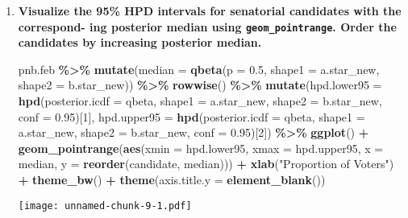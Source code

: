 \documentclass[]{article}
\newenvironment{Shaded}{\begin{snugshade}}{\end{snugshade}}
\newcommand{\AttributeTok}[1]{\textcolor[rgb]{0.13,0.29,0.53}{#1}}
\newcommand{\DecValTok}[1]{\textcolor[rgb]{0.00,0.00,0.81}{#1}}
\newcommand{\FloatTok}[1]{\textcolor[rgb]{0.00,0.00,0.81}{#1}}
\newcommand{\FunctionTok}[1]{\textcolor[rgb]{0.13,0.29,0.53}{\textbf{#1}}}
\newcommand{\NormalTok}[1]{#1}
\newcommand{\SpecialCharTok}[1]{\textcolor[rgb]{0.81,0.36,0.00}{\textbf{#1}}}
\newcommand{\StringTok}[1]{\textcolor[rgb]{0.31,0.60,0.02}{#1}}
\begin{document}
\begin{enumerate}
    
\item \textbf{Visualize the 95\% HPD intervals for senatorial candidates with the correspond-
ing posterior median using \texttt{geom\_pointrange}. Order the candidates by increasing posterior median.}

\begin{Shaded}
\begin{Highlighting}[]
\NormalTok{pnb.feb }\SpecialCharTok{\%\textgreater{}\%}
  \FunctionTok{mutate}\NormalTok{(}\AttributeTok{median =} \FunctionTok{qbeta}\NormalTok{(}\AttributeTok{p =} \FloatTok{0.5}\NormalTok{, }\AttributeTok{shape1 =}\NormalTok{ a.star\_new, }\AttributeTok{shape2 =}\NormalTok{ b.star\_new)) }\SpecialCharTok{\%\textgreater{}\%}
  \FunctionTok{rowwise}\NormalTok{() }\SpecialCharTok{\%\textgreater{}\%}
  \FunctionTok{mutate}\NormalTok{(}\AttributeTok{hpd.lower95 =} \FunctionTok{hpd}\NormalTok{(}\AttributeTok{posterior.icdf =}\NormalTok{ qbeta,}
                           \AttributeTok{shape1 =}\NormalTok{ a.star\_new,}
                           \AttributeTok{shape2 =}\NormalTok{ b.star\_new,}
                           \AttributeTok{conf =} \FloatTok{0.95}\NormalTok{)[}\DecValTok{1}\NormalTok{],}
         \AttributeTok{hpd.upper95 =} \FunctionTok{hpd}\NormalTok{(}\AttributeTok{posterior.icdf =}\NormalTok{ qbeta,}
                           \AttributeTok{shape1 =}\NormalTok{ a.star\_new,}
                           \AttributeTok{shape2 =}\NormalTok{ b.star\_new,}
                           \AttributeTok{conf =} \FloatTok{0.95}\NormalTok{)[}\DecValTok{2}\NormalTok{]) }\SpecialCharTok{\%\textgreater{}\%}
  \FunctionTok{ggplot}\NormalTok{() }\SpecialCharTok{+}
  \FunctionTok{geom\_pointrange}\NormalTok{(}\FunctionTok{aes}\NormalTok{(}\AttributeTok{xmin =}\NormalTok{ hpd.lower95, }
                      \AttributeTok{xmax =}\NormalTok{ hpd.upper95, }
                      \AttributeTok{x =}\NormalTok{ median,}
                      \AttributeTok{y =} \FunctionTok{reorder}\NormalTok{(candidate, median))) }\SpecialCharTok{+}
  \FunctionTok{xlab}\NormalTok{(}\StringTok{"Proportion of Voters"}\NormalTok{) }\SpecialCharTok{+}
  \FunctionTok{theme\_bw}\NormalTok{() }\SpecialCharTok{+}
  \FunctionTok{theme}\NormalTok{(}\AttributeTok{axis.title.y =} \FunctionTok{element\_blank}\NormalTok{())}
\end{Highlighting}
\end{Shaded}

\texttt{[image: unnamed-chunk-9-1.pdf]}


\end{enumerate}
\end{document}
